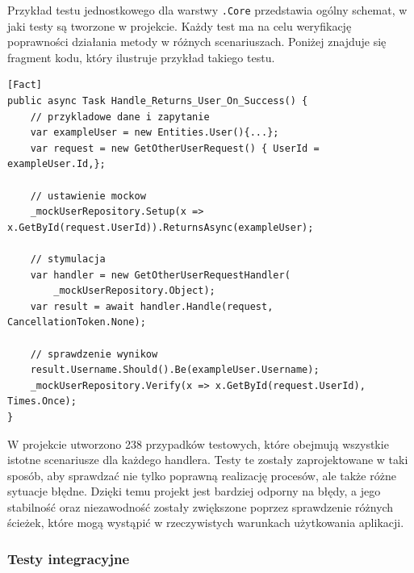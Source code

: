 \documentclass[twoside]{projektInzynierskiMS1}
\begin{document}
\newpage

\noindent
Przykład testu jednostkowego dla warstwy \texttt{.Core} przedstawia ogólny schemat, w jaki testy są tworzone w projekcie. Każdy test ma na celu weryfikację poprawności działania metody w różnych scenariuszach. Poniżej znajduje się fragment kodu, który ilustruje przykład takiego testu.

\vspace{0.5cm}
\begin{lstlisting}[language=CSharp]
[Fact]
public async Task Handle_Returns_User_On_Success() {
    // przykladowe dane i zapytanie
    var exampleUser = new Entities.User(){...};
    var request = new GetOtherUserRequest() { UserId = exampleUser.Id,};

    // ustawienie mockow
    _mockUserRepository.Setup(x => x.GetById(request.UserId)).ReturnsAsync(exampleUser);

    // stymulacja
    var handler = new GetOtherUserRequestHandler(
        _mockUserRepository.Object);
    var result = await handler.Handle(request, CancellationToken.None);

    // sprawdzenie wynikow
    result.Username.Should().Be(exampleUser.Username);
    _mockUserRepository.Verify(x => x.GetById(request.UserId), Times.Once);
}
\end{lstlisting}
\vspace{0.5cm}

\noindent
W projekcie utworzono 238 przypadków testowych, które obejmują wszystkie istotne scenariusze dla każdego handlera. Testy te zostały zaprojektowane w taki sposób, aby sprawdzać nie tylko poprawną realizację procesów, ale także różne sytuacje błędne. Dzięki temu projekt jest bardziej odporny na błędy, a jego stabilność oraz niezawodność zostały zwiększone poprzez sprawdzenie różnych ścieżek, które mogą wystąpić w rzeczywistych warunkach użytkowania aplikacji.
\newpage

\subsubsection{Testy integracyjne}
\end{document}
